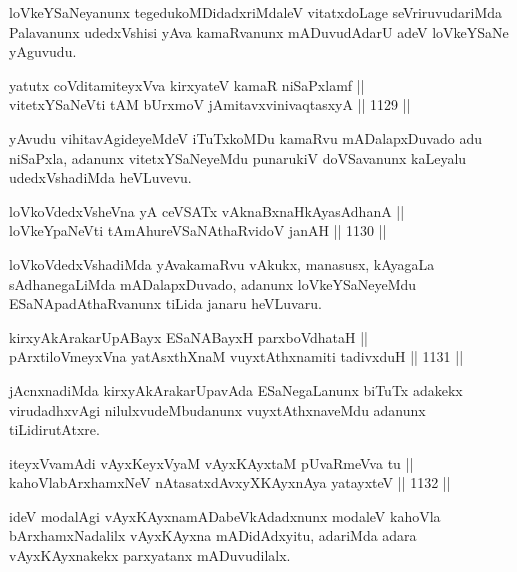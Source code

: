 \begin{artha}
loVkeYSaNeyanunx tegedukoMDidadxriMdaleV vitatxdoLage seVriruvudariMda Palavanunx udedxVshisi yAva kamaRvanunx mADuvudAdarU adeV loVkeYSaNe yAguvudu.
\end{artha}

\begin{shl}
yatutx coVditamiteyxVva kirxyateV kamaR niSaPxlamf || \\
vitetxYSaNeVti tAM bUrxmoV jAmitavxvinivaqtasxyA ||  1129 ||  
\end{shl}

\begin{artha}
yAvudu vihitavAgideyeMdeV iTuTxkoMDu kamaRvu mADalapxDuvado adu niSaPxla, adanunx vitetxYSaNeyeMdu punarukiV doVSavanunx kaLeyalu udedxVshadiMda heVLuvevu.
\end{artha}


\begin{shl}
loVkoVdedxVsheVna yA ceVSATx vAknaBxnaHkAyasAdhanA || \\
loVkeYpaNeVti tAmAhureVSaNAthaRvidoV janAH ||  1130 ||  
\end{shl}

\begin{artha}
loVkoVdedxVshadiMda yAvakamaRvu vAkukx, manasusx, kAyagaLa sAdhanegaLiMda mADalapxDuvado, adanunx loVkeYSaNeyeMdu ESaNApadAthaRvanunx tiLida janaru heVLuvaru.
\end{artha}


\begin{shl}
kirxyAkArakarUpABayx ESaNABayxH parxboVdhataH || \\
pArxtiloVmeyxVna yatAsxthXnaM vuyxtAthxnamiti tadivxduH ||  1131 ||  
\end{shl}

\begin{artha}
jAcnxnadiMda kirxyAkArakarUpavAda ESaNegaLanunx biTuTx adakekx virudadhxvAgi nilulxvudeMbudanunx vuyxtAthxnaveMdu adanunx tiLidirutAtxre.
\end{artha}

\begin{shl}
iteyxVvamAdi vAyxKeyxVyaM vAyxKAyxtaM pUvaRmeVva tu || \\
kahoVlabArxhamxNeV nAtasatxdAvxyXKAyxnAya yatayxteV ||  1132 ||  
\end{shl}

\begin{artha}
ideV modalAgi vAyxKAyxnamADabeVkAdadxnunx modaleV kahoVla bArxhamxNadalilx vAyxKAyxna mADidAdxyitu, adariMda adara vAyxKAyxnakekx parxyatanx mADuvudilalx.
\end{artha}


